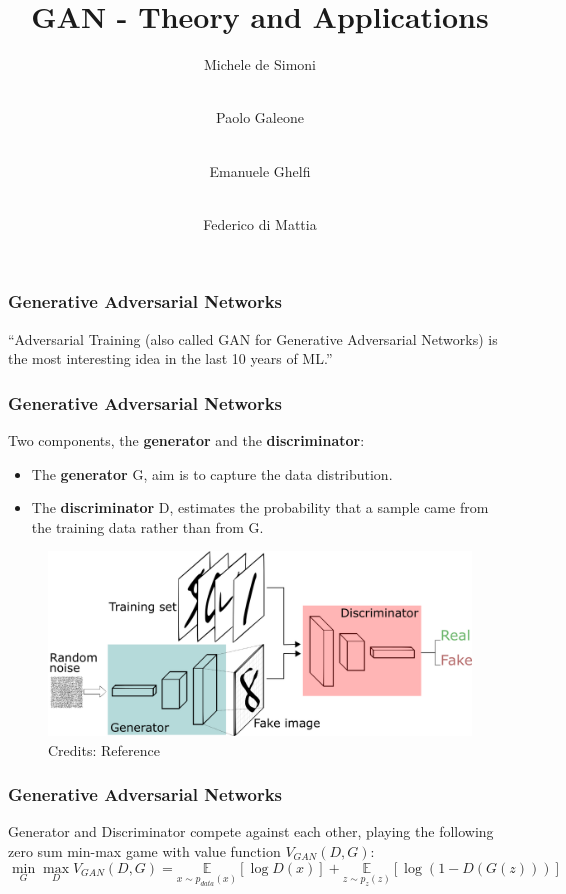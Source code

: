 \documentclass{beamer}
\title[GAN] %
{GAN - Theory and Applications}
\author %
{Michele de Simoni  \and  \\ Paolo Galeone \and \\ Emanuele Ghelfi \and \\ Federico di Mattia}
\begin{document}
 
{
  \begin{frame}
    \titlepage
  \end{frame}
}

 
\begin{frame}
\frametitle{Generative Adversarial Networks}

\begin{block}{}
	{\large ``Adversarial Training (also called GAN for Generative Adversarial Networks) is the most interesting idea in the last 10 years of ML.''}
	\vskip5mm
	\hspace*{}
\end{block}

\end{frame}

\begin{frame}
\frametitle{Generative Adversarial Networks}
	Two components, the \textbf{generator} and the \textbf{discriminator}:
	\begin{itemize}
		\item The \textbf{generator} G, aim is to capture the data distribution.
		\item The \textbf{discriminator} D, estimates the probability that a sample came from the training data rather than from G.
	\end{itemize}

\begin{figure}
	\includegraphics[width=\textwidth]{GANs.png}
	\caption{Credits: Reference  }
\end{figure}

\end{frame}

\begin{frame}
\frametitle{Generative Adversarial Networks}
Generator and Discriminator compete against each other, playing the following zero sum min-max game with value function $V_{GAN}(D,G)$:
\begin{equation}
 \min_G \max_D V_{GAN}(D,G) =\underset{x \sim p_{data}(x)}{\mathbb{E}} [\log D(x)]  + \underset{z \sim p_z(z)}{\mathbb{E}}[\log(1 - D(G(z)))] 
\end{equation}

\end{frame}
\end{document}

